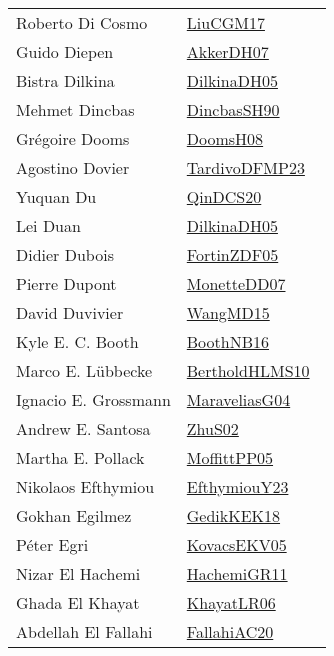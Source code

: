 {\begin{longtable}{p{4cm}p{20cm}}
Roberto Di Cosmo & \href{papers/LiuCGM17.pdf}{LiuCGM17}~\cite{LiuCGM17}\\
Guido Diepen & \href{papers/AkkerDH07.pdf}{AkkerDH07}~\cite{AkkerDH07}\\
Bistra Dilkina & \href{papers/DilkinaDH05.pdf}{DilkinaDH05}~\cite{DilkinaDH05}\\
Mehmet Dincbas & \href{articles/DincbasSH90.pdf}{DincbasSH90}~\cite{DincbasSH90}\\
Gr{\'{e}}goire Dooms & \href{papers/DoomsH08.pdf}{DoomsH08}~\cite{DoomsH08}\\
Agostino Dovier & \href{papers/TardivoDFMP23.pdf}{TardivoDFMP23}~\cite{TardivoDFMP23}\\
Yuquan Du & \href{articles/QinDCS20.pdf}{QinDCS20}~\cite{QinDCS20}\\
Lei Duan & \href{papers/DilkinaDH05.pdf}{DilkinaDH05}~\cite{DilkinaDH05}\\
Didier Dubois & \href{papers/FortinZDF05.pdf}{FortinZDF05}~\cite{FortinZDF05}\\
Pierre Dupont & \href{papers/MonetteDD07.pdf}{MonetteDD07}~\cite{MonetteDD07}\\
David Duvivier & \href{articles/WangMD15.pdf}{WangMD15}~\cite{WangMD15}\\
Kyle E. C. Booth & \href{papers/BoothNB16.pdf}{BoothNB16}~\cite{BoothNB16}\\
Marco E. L{\"{u}}bbecke & \href{papers/BertholdHLMS10.pdf}{BertholdHLMS10}~\cite{BertholdHLMS10}\\
Ignacio E. Grossmann & \href{papers/MaraveliasG04.pdf}{MaraveliasG04}~\cite{MaraveliasG04}\\
Andrew E. Santosa & \href{papers/ZhuS02.pdf}{ZhuS02}~\cite{ZhuS02}\\
Martha E. Pollack & \href{papers/MoffittPP05.pdf}{MoffittPP05}~\cite{MoffittPP05}\\
Nikolaos Efthymiou & \href{papers/EfthymiouY23.pdf}{EfthymiouY23}~\cite{EfthymiouY23}\\
Gokhan Egilmez & \href{articles/GedikKEK18.pdf}{GedikKEK18}~\cite{GedikKEK18}\\
P{\'{e}}ter Egri & \href{papers/KovacsEKV05.pdf}{KovacsEKV05}~\cite{KovacsEKV05}\\
Nizar El Hachemi & \href{articles/HachemiGR11.pdf}{HachemiGR11}~\cite{HachemiGR11}\\
Ghada El Khayat & \href{articles/KhayatLR06.pdf}{KhayatLR06}~\cite{KhayatLR06}\\
Abdellah El Fallahi & \href{}{FallahiAC20}~\cite{FallahiAC20}\\

\end{longtable}}
